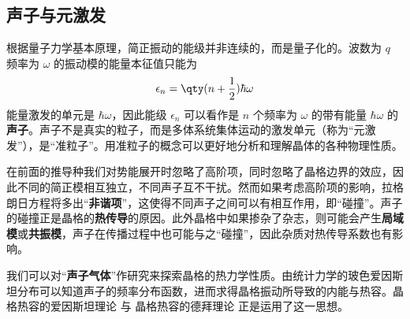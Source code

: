 \subsection{声子与元激发}

根据量子力学基本原理，简正振动的能级并非连续的，而是量子化的。波数为 $q$ 频率为 $\omega$ 的振动模的能量本征值只能为
\begin{equation}
\epsilon_n=\qty(n+\frac{1}{2})\hbar\omega
\end{equation}
能量激发的单元是 $\hbar\omega$，因此能级 $\epsilon_n$ 可以看作是 $n$ 个频率为 $\omega$ 的带有能量 $\hbar\omega$ 的\textbf{声子}。声子不是真实的粒子，而是多体系统集体运动的激发单元（称为“元激发”），是“准粒子”。用准粒子的概念可以更好地分析和理解晶体的各种物理性质。

在前面的推导种我们对势能展开时忽略了高阶项，同时忽略了晶格边界的效应，因此不同的简正模相互独立，不同声子互不干扰。然而如果考虑高阶项的影响，拉格朗日方程将多出“\textbf{非谐项}”，这使得不同声子之间可以有相互作用，即“碰撞”。声子的碰撞正是晶格的\textbf{热传导}的原因。此外晶格中如果掺杂了杂志，则可能会产生\textbf{局域模}或\textbf{共振模}，声子在传播过程中也可能与之“碰撞”，因此杂质对热传导系数也有影响。

我们可以对“\textbf{声子气体}”作研究来探索晶格的热力学性质。由统计力学的玻色爱因斯坦分布可以知道声子的频率分布函数，进而求得晶格振动所导致的内能与热容。晶格热容的爱因斯坦理论 与 晶格热容的德拜理论 正是运用了这一思想。